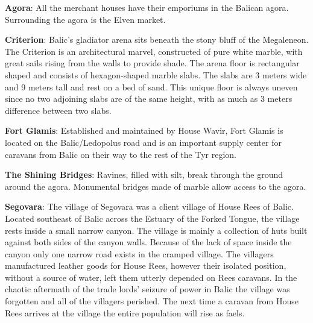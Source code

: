 {
	\textbf{Agora}: All the merchant houses have their emporiums in the Balican agora. Surrounding the agora is the Elven market.

	\textbf{Criterion}: Balic's gladiator arena sits beneath the stony bluff of the Megaleneon. The Criterion is an architectural marvel, constructed of pure white marble, with great sails rising from the walls to provide shade. The arena floor is rectangular shaped and consists of hexagon-shaped marble slabs. The slabs are 3 meters wide and 9 meters tall and rest on a bed of sand. This unique floor is always uneven since no two adjoining slabs are of the same height, with as much as 3 meters difference between two slabs.

	\textbf{Fort Glamis}: Established and maintained by House Wavir, Fort Glamis is located on the Balic/Ledopolus road and is an important supply center for caravans from Balic on their way to the rest of the Tyr region.

	\textbf{The Shining Bridges}: Ravines, filled with silt, break through the ground around the agora. Monumental bridges made of marble allow access to the agora.

	\textbf{Segovara}: The village of Segovara was a client village of House Rees of Balic. Located southeast of Balic across the Estuary of the Forked Tongue, the village rests inside a small narrow canyon. The village is mainly a collection of huts built against both sides of the canyon walls. Because of the lack of space inside the canyon only one narrow road exists in the cramped village. The villagers manufactured leather goods for House Rees, however their isolated position, without a source of water, left them utterly depended on Rees caravans. In the chaotic aftermath of the trade lords' seizure of power in Balic the village was forgotten and all of the villagers perished. The next time a caravan from House Rees arrives at the village the entire population will rise as faels.
}
